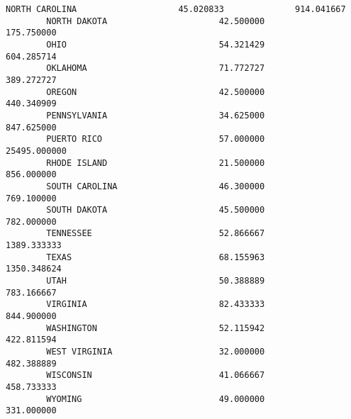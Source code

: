 \documentclass[11pt]{article}
\begin{document}
\begin{Verbatim}[commandchars=\\\{\}]
        NORTH CAROLINA                    45.020833              914.041667   
        NORTH DAKOTA                      42.500000              175.750000   
        OHIO                              54.321429              604.285714   
        OKLAHOMA                          71.772727              389.272727   
        OREGON                            42.500000              440.340909   
        PENNSYLVANIA                      34.625000              847.625000   
        PUERTO RICO                       57.000000            25495.000000   
        RHODE ISLAND                      21.500000              856.000000   
        SOUTH CAROLINA                    46.300000              769.100000   
        SOUTH DAKOTA                      45.500000              782.000000   
        TENNESSEE                         52.866667             1389.333333   
        TEXAS                             68.155963             1350.348624   
        UTAH                              50.388889              783.166667   
        VIRGINIA                          82.433333              844.900000   
        WASHINGTON                        52.115942              422.811594   
        WEST VIRGINIA                     32.000000              482.388889   
        WISCONSIN                         41.066667              458.733333   
        WYOMING                           49.000000              331.000000   
        

\end{Verbatim}
\end{document}
